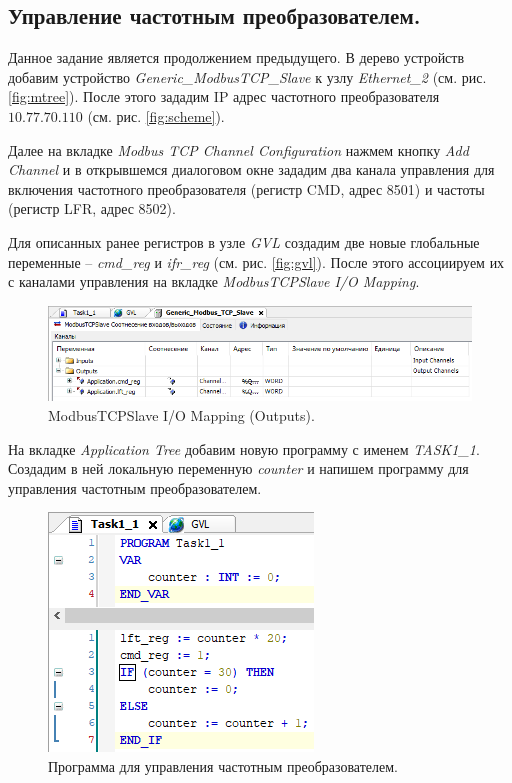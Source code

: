\documentclass[a4paper, 12pt]{article}
\begin{document}
    
    \subsection{Управление частотным преобразователем.}
    Данное задание является продолжением предыдущего. В дерево устройств добавим устройство
    \textit{Generic\_{ModbusTCP}\_{Slave}} к узлу \textit{Ethernet\_{2}} (см. рис. \ref{fig:mtree}).
    После этого зададим IP адрес частотного преобразователя $10.77.70.110$ (см. рис. \ref{fig:scheme}).


    Далее на вкладке \textit{Modbus TCP Channel Configuration} нажмем кнопку \textit{Add Channel} и
    в открывшемся диалоговом окне зададим два канала управления для включения частотного преобразователя
    (регистр CMD, адрес 8501) и частоты (регистр LFR, адрес 8502).


    Для описанных ранее регистров в узле \textit{GVL} создадим две новые глобальные переменные -- \textit{cmd\_{reg}}
    и \textit{ifr\_{reg}} (см. рис. \ref{fig:gvl}). После этого ассоциируем их с каналами управления на вкладке
    \textit{ModbusTCPSlave I/O Mapping}.
    \begin{figure}[H]
        \centering
        \includegraphics[scale=0.8]{gmtcps.png}
        \captionsetup{skip=0pt}
        \caption{ModbusTCPSlave I/O Mapping (Outputs).}
        \label{fig:gmtcps}
    \end{figure}


    На вкладке \textit{Application Tree} добавим новую программу с именем \textit{TASK1\_{1}}. Создадим в ней
    локальную переменную \textit{counter} и напишем программу для управления частотным преобразователем.
    \begin{figure}[H]
        \centering
        \includegraphics[scale=1.3]{code.png}
        \captionsetup{skip=0pt}
        \caption{Программа для управления частотным преобразователем.}
        \label{fig:codeplc}
    \end{figure}
\end{document}
